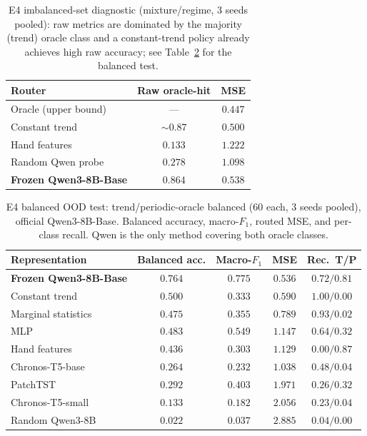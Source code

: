 \documentclass{article}
\begin{document}
\begin{table}[t]
\centering
\small
\begin{tabular}{lcc}
\toprule
Router & Raw oracle-hit & MSE \\
\midrule
Oracle (upper bound) & --- & $0.447$ \\
Constant trend & $\sim0.87$ & $0.500$ \\
Hand features & $0.133$ & $1.222$ \\
Random Qwen probe & $0.278$ & $1.098$ \\
\textbf{Frozen Qwen3-8B-Base} & $0.864$ & $0.538$ \\
\bottomrule
\end{tabular}
\caption{E4 imbalanced-set diagnostic (mixture/regime, 3 seeds pooled): raw
metrics are dominated by the majority (trend) oracle class and a constant-trend
policy already achieves high raw accuracy; see Table~\ref{tab:e4bal} for the
balanced test.}
\label{tab:e4}
\end{table}

\begin{table}[t]
\centering
\small
\begin{tabular}{lcccc}
\toprule
Representation & Balanced acc. & Macro-$F_1$ & MSE & Rec.\ T/P \\
\midrule
\textbf{Frozen Qwen3-8B-Base} & $\mathbf{0.764}$ & $\mathbf{0.775}$ & $\mathbf{0.536}$ & $0.72/0.81$ \\
Constant trend & $0.500$ & $0.333$ & $0.590$ & $1.00/0.00$ \\
Marginal statistics & $0.475$ & $0.355$ & $0.789$ & $0.93/0.02$ \\
MLP & $0.483$ & $0.549$ & $1.147$ & $0.64/0.32$ \\
Hand features & $0.436$ & $0.303$ & $1.129$ & $0.00/0.87$ \\
Chronos-T5-base & $0.264$ & $0.232$ & $1.038$ & $0.48/0.04$ \\
PatchTST & $0.292$ & $0.403$ & $1.971$ & $0.26/0.32$ \\
Chronos-T5-small & $0.133$ & $0.182$ & $2.056$ & $0.23/0.04$ \\
Random Qwen3-8B & $0.022$ & $0.037$ & $2.885$ & $0.04/0.00$ \\
\bottomrule
\end{tabular}
\caption{E4 balanced OOD test: trend/periodic-oracle balanced (60 each, 3
seeds pooled), official Qwen3-8B-Base.  Balanced accuracy, macro-$F_1$, routed
MSE, and per-class recall.  Qwen is the only method covering both oracle
classes.}
\label{tab:e4bal}
\end{table}
\end{document}
